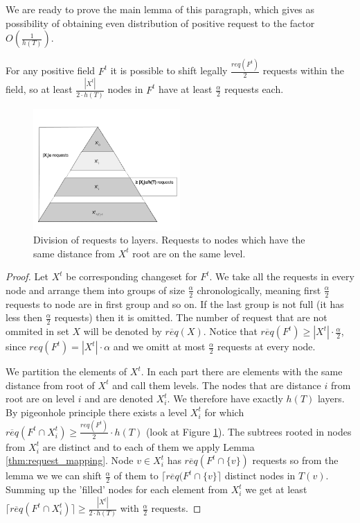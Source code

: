 We are ready to prove the main lemma of this paragraph, which gives as 
possibility of obtaining even distribution of positive request to the factor 
$O(\frac{1}{h(T)})$.
\begin{lemma}
For any positive field $F^t$ it is possible to shift 
legally $\frac{req(F^t)}{2}$ requests within the field, so at least 
$\frac{|X^t|}{2 \cdot h(T)}$ nodes in $F^t$ have at least 
$\frac{\alpha}{2}$ requests each.
\label{thm:legal_shifting_down}
\end{lemma}
 \begin{figure}
 \begin{center}
  \includegraphics[width=0.5\textwidth]{layers.png}
\end{center}
\caption{Division of requests to layers. Requests to nodes which have the same 
distance from $X^t$ root are on the same level.}
\label{fig:layers}
\end{figure}
\begin{proof}
Let $X^t$ be corresponding changeset for $F^t$. We take all the requests in 
every node and arrange them into groups of size $\frac{\alpha}{2}$ 
chronologically, meaning first $\frac{\alpha}{2}$ requests to node are in first 
group and so on. If the last group is not full (it has less then  
$\frac{\alpha}{2}$ requests) then it is omitted. The number of request that are 
not ommited in set $X$ will be denoted by $\overline{req}(X)$. Notice that  
$\overline{req}(F^t) \geq |X^t| \cdot \frac{\alpha}{2}$, since $req(F^t) = 
|X^t| \cdot \alpha$ and we omitt at most $\frac{\alpha}{2}$ requests at every 
node.

We partition the elements of $X^t$. In each part there are elements with the 
same distance from root of $X^t$ and call them levels. The nodes that are 
distance $i$ from root are on level $i$ and are denoted $X^t_i$. We therefore 
have exactly $h(T)$ layers. By pigeonhole principle there exists a level 
$X^t_i$ for which $\overline{req}(F^t \cap X^t_i) \geq \frac{req(F^t)}{2} \cdot 
h(T)$ (look at Figure \ref{fig:layers}). The subtrees rooted in nodes from 
$X^t_i$ are distinct and to each of them we apply Lemma 
\ref{thm:request_mapping}. Node $v \in X^t_i$ has $\overline{req}(F^t \cap 
\{v\})$ requests so from the lemma we we can shift $\frac{\alpha}{2}$ of 
them to $\lceil \overline{req}(F^t \cap \{v\} \rceil$ distinct nodes in $T(v)$. 
Summing up the 'filled' nodes for each element from $X^t_i$ we get at least 
$\lceil \overline{req}(F^t \cap X^t_i) \rceil \geq \frac{|X^t|}{2 \cdot h(T)}$ 
with $\frac{\alpha}{2}$ requests.
\end{proof}
